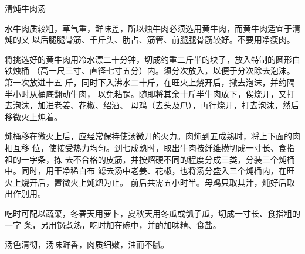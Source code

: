 \begin{recipe}{清炖牛肉汤}

\ingredients


\preparation

水牛肉质较粗，草气重，鲜味差，所以烛牛肉必须选用黄牛肉，而黄牛肉适宜于清炖的又
以后腿腿骨筋、千斤头、肋占、筋管、前腿腿骨筋较好。不要用净瘦肉。

将挑选好的黄牛肉用冷水漂二十分钟，切成约重二斤半的块子，放入特制的圆形白铁烛桶
（高一尺三寸、直径七寸五分）内。须分次放入，以便于分次除去泡沫。第一次放进十五
斤，同时下入沸水二十斤，在旺火上烧开后，撇去泡沫，并约隔半小时从桶底翻动牛肉，
以免粘锅。随即将其余十斤半牛肉放下，俟烧开，又打去泡沫，加进老姜、花椒、绍酒、
母鸡（去头及爪），再行烧开，打去泡沫，然后移微火上炖着。

炖桶移在微火上后，应经常保持使汤微开的火力。肉炖到五成熟时，将上下面的肉相互移
位，使接受热力均匀。到七成熟时，取出牛肉按纤维横切成一寸长、食指祖的一字条，拣
去不合格的皮筋，并按炤硬不同的程度分成三类，分装三个炖桶中。同时，用干净稀白布
滤去汤中老姜、花椒，也将汤分盛入三个炖桶内，在旺火上烧开后，置微火上炖𤆵为止。
前后共需五小时半。母鸡只取其汁，炖好后取出作别用。

吃时可配以蔬菜，冬春天用萝卜，夏秋天用冬瓜或瓠子瓜，切成一寸长、食指粗的一字
条，另用锅煮熟，吃时加在碗中，并酌加味精、食盐。

\features

汤色清彻，汤味鲜香，肉质细嫩，油而不腻。

\end{recipe}

